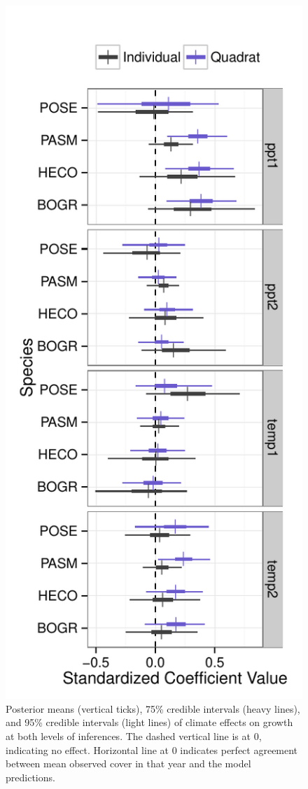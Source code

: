 \documentclass[12pt,]{article}
\begin{document}
\begin{figure}[htbp]
\centering
\includegraphics{components/figure/manuscript-figure_2.pdf}
\caption{Posterior means (vertical ticks), 75\% credible intervals
(heavy lines), and 95\% credible intervals (light lines) of climate
effects on growth at both levels of inferences. The dashed vertical line
is at 0, indicating no effect. Horizontal line at 0 indicates perfect
agreement between mean observed cover in that year and the model
predictions.}
\end{figure}
\end{document}
